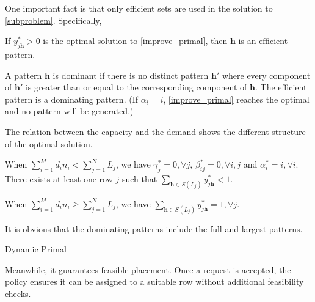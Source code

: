 One important fact is that only efficient sets are used in the solution to \eqref{subproblem}. Specifically, 

\begin{lem}
    If $y_{j \bm{h}}^{*} > 0$ is the optimal solution to \eqref{improve_primal}, then $\bm{h}$ is an efficient pattern.
\end{lem}


A pattern $\bm{h}$ is dominant if there is no distinct pattern $\bm{h}{'}$ where every component of $\bm{h}{'}$ is greater than or equal to the corresponding component of $\bm{h}$. The efficient pattern is a dominating pattern. (If $\alpha_{i} = i$, \eqref{improve_primal} reaches the optimal and no pattern will be generated.)

The relation between the capacity and the demand shows the different structure of the optimal solution.

\begin{lem}
When $\sum_{i=1}^{M} d_{i} n_{i} < \sum_{j=1}^{N} L_{j}$, we have $\gamma_{j}^{*} =0, \forall j$, $\beta_{ij}^{*} =0, \forall i,j$ and $\alpha^{*}_{i} = i, \forall i$. There exists at least one row $j$ such that $\sum_{\bm{h} \in S(L_{j})} y_{j \bm{h}}^{*} < 1$.

When $\sum_{i=1}^{M} d_{i} n_{i} \geq \sum_{j=1}^{N} L_{j}$, we have $\sum_{\bm{h} \in S(L_{j})} y_{j \bm{h}}^{*} = 1, \forall j$.
\end{lem}


It is obvious that the dominating patterns include the full and largest patterns.

\begin{algorithm}[H]
    \caption{Dynamic Primal}\label{algo_improve_primal}
\end{algorithm}

Meanwhile, it guarantees feasible placement. Once a request is accepted, the policy ensures it can be assigned to a suitable row without additional feasibility checks.

